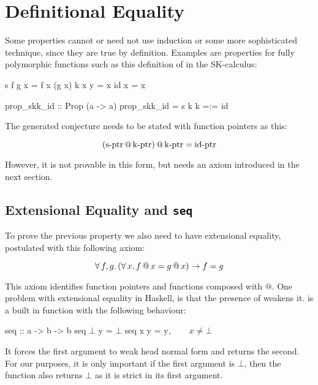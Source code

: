 \section{Definitional Equality}
\label{sec:equality}

Some properties cannot or need not use induction or some more
sophisticated technique, since they are true by definition. Examples
are properties for fully polymorphic functions such as this definition
of  in the SK-calculus:

\begin{code}
s f g x = f x (g x)
k x y = x
id x = x

prop_skk_id :: Prop (a -> a)
prop_skk_id = s k k =:= id
\end{code}

\noindent
The generated conjecture needs to be stated with function pointers as
this:

\begin{equation*}
(\mathrm{\operatorname{s-ptr}} \, @ \, \mathrm{\operatorname{k-ptr}} )
     \, @ \, \mathrm{\operatorname{k-ptr}} = \mathrm{\operatorname{id-ptr}}
\end{equation*}

\noindent
However, it is not provable in this form, but needs an axiom
introduced in the next section.

\subsection{Extensional Equality and \texttt{seq}}

To prove the previous property we also need to have extensional
equality, postulated with this following axiom:

\begin{equation*}
\forall \, f , g . \, (\forall \, x . \, f \, @ \, x = g \, @ \, x) \rightarrow f = g
\end{equation*}

\noindent
This axiom identifies function pointers and functions composed with $@$.
One problem with extensional equality in Haskell, is that the presence
of  weakens it.  is a built in function with the
following behaviour:

\begin{code}[mathescape]
seq :: a -> b -> b
seq $\bot$ y = $\bot$
seq x y = y$, \qquad x \neq \bot$
\end{code}

It forces the first argument to weak head normal form and returns the
second. For our purposes, it is only important if the first argument
is $\bot$, then the function also returns $\bot$ as it is strict in its
first argument.

